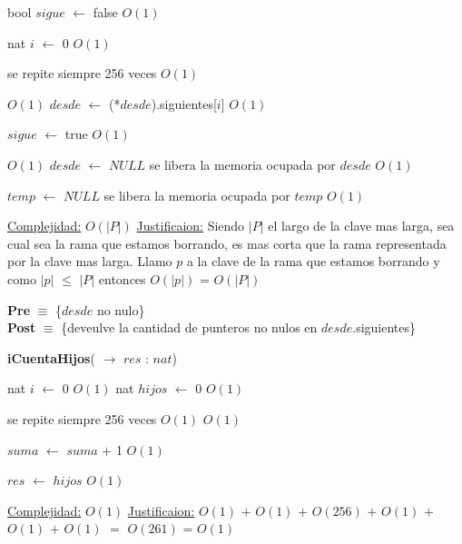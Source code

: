 \begin{Algoritmos}
\begin{algorithm}[H]
\begin{algorithmic}[1]
	\State bool $sigue$ $\gets$ false \Comment $O(1)$

	\State nat $i$ $\gets$ 0 \State $O(1)$

	 \Comment se repite siempre 256 veces $O(1)$

		 \Comment $O(1)$
			\State $desde$ $\gets$ (*$desde$).siguientes[$i$] \Comment $O(1)$		
		
			\State $sigue$ $\gets$ true \Comment $O(1)$		
		
		\EndIf
	\EndWhile

\EndWhile

 \Comment $O(1)$
	\State $desde$ $\gets$ $NULL$ \Comment se libera la memoria ocupada por $desde$ $O(1)$

\EndIf

\State $temp$ $\gets$ $NULL$ \Comment se libera la memoria ocupada por $temp$ $O(1)$


\medskip
\State \underline{Complejidad:} $O(|P|)$
\State \underline{Justificaion:} Siendo $|P|$ el largo de la clave mas larga, sea cual sea la rama que estamos borrando, es mas corta que la rama representada por la clave mas larga. Llamo $p$ a la clave de la rama que estamos borrando y como $|p|$ $\leq$ $|P|$ entonces $O(|p|)$ = $O(|P|)$ 

\end{algorithmic}
\end{algorithm}
  
 

\textbf{Pre} $\equiv$ \{$desde$ no nulo\}\\%
\textbf{Post} $\equiv$ \{deveulve la cantidad de punteros no nulos en $desde$.siguientes\}%

\begin{algorithm}[H]
{\textbf{iCuentaHijos}(} $\to$ $res$ : $nat$)
\begin{algorithmic}[1]

\State nat $i$ $\gets$ 0 \Comment $O(1)$
\State nat $hijos$ $\gets$ 0 \Comment $O(1)$

 \Comment se repite siempre 256 veces $O(1)$
	 \State $O(1)$ 
	
	\State $suma$ $\gets$ $suma$ $+$ 1 \Comment $O(1)$
	
	\EndIf
\EndWhile
\State $res$ $\gets$ $hijos$ \Comment $O(1)$


\medskip
\State \underline{Complejidad:} $O(1)$
\State \underline{Justificaion:}  $O(1)$ $+$ $O(1)$ $+$ $O(256)$ $+$ $O(1)$ $+$ $O(1)$ $+$ $O(1)$ $=$ $O(261)$ = $O(1)$

\end{algorithmic}
\end{algorithm}
  
  
  
\end{Algoritmos}

